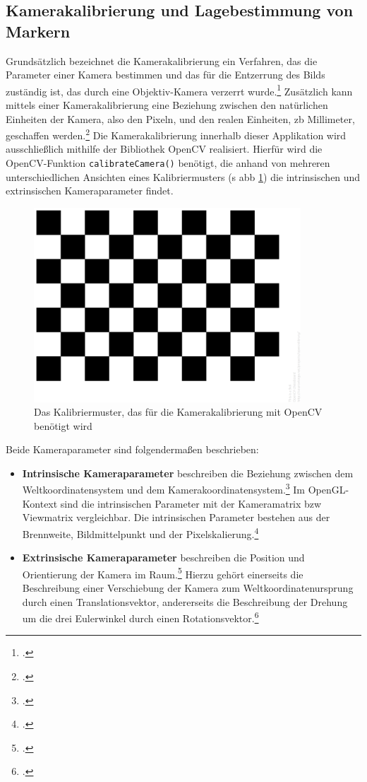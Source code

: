 \subsection{Kamerakalibrierung und Lagebestimmung von Markern}
Grundsätzlich bezeichnet die Kamerakalibrierung ein Verfahren, das die Parameter einer Kamera bestimmen und das für die Entzerrung des Bilds zuständig ist, das durch eine Objektiv-Kamera verzerrt wurde.\footcite{Hofmann2017} Zusätzlich kann mittels einer Kamerakalibrierung eine Beziehung zwischen den natürlichen Einheiten der Kamera, also den Pixeln, und den realen Einheiten, \acs{zb} Millimeter, geschaffen werden.\footcite{opencvCameraCalibration} Die Kamerakalibrierung innerhalb dieser Applikation wird ausschließlich mithilfe der Bibliothek OpenCV realisiert. Hierfür wird die OpenCV-Funktion \texttt{calibrateCamera()} benötigt, die anhand von mehreren unterschiedlichen Ansichten eines Kalibriermusters (\acs{s} \acs{abb} \ref{fig:ChessboardPattern}) die intrinsischen und extrinsischen Kameraparameter findet.

\begin{figure}[H]
\centering
\includegraphics[width=10cm]{Bilder/Implementierung/pattern.png}
\caption[Das Kalibriermuster, das für die Kamerakalibrierung mit OpenCV benötigt wird]{Das Kalibriermuster, das für die Kamerakalibrierung mit OpenCV benötigt wird\protect\footnotemark}
\label{fig:ChessboardPattern}
\end{figure}

\noindent Beide Kameraparameter sind folgendermaßen beschrieben:

\begin{itemize}
\item \textbf{Intrinsische Kameraparameter} beschreiben die Beziehung zwischen dem  Weltkoordinatensystem und dem Kamerakoordinatensystem.\footcite{Hofmann2017} Im OpenGL-Kontext sind die intrinsischen Parameter mit der Kameramatrix \acs{bzw} Viewmatrix vergleichbar. Die intrinsischen Parameter bestehen aus der Brennweite, Bildmittelpunkt und der Pixelskalierung.\footcite{Hofmann2017}
\item \textbf{Extrinsische Kameraparameter} \glqq beschreiben die Position und Orientierung der Kamera im Raum.\grqq\footcite{Hofmann2017} Hierzu gehört einerseits die Beschreibung einer Verschiebung der Kamera zum Weltkoordinatenursprung durch einen Translationsvektor, andererseits die Beschreibung der Drehung um die drei Eulerwinkel durch einen Rotationsvektor.\footcite{Hofmann2017}
\end{itemize}

